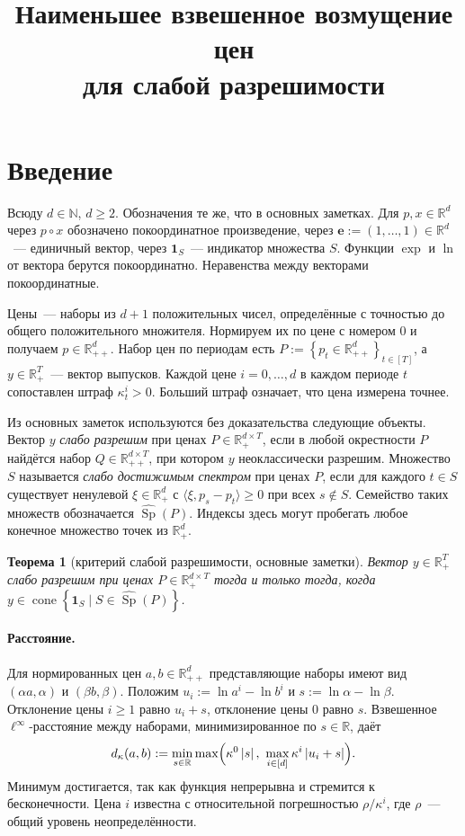 \documentclass[a4paper,11pt]{article}
\title{Наименьшее взвешенное возмущение цен\\ для слабой разрешимости}
\date{}
\theoremstyle{plain}
\newtheorem{theorem}{Теорема}[section]
\theoremstyle{definition}
\theoremstyle{remark}
\newcommand{\R}{\mathbb{R}}
\newcommand{\N}{\mathbb{N}}
\newcommand{\abs}[1]{\left\lvert #1 \right\rvert}
\newcommand{\set}[1]{\left\{ #1 \right\}}
\newcommand{\ip}[2]{\langle #1, #2\rangle} %
\newcommand{\Rpp}[1][2]{\R^{#1}_{++}} %
\newcommand{\Rp}[1][2]{\R^{#1}_{+}}   %
\DeclareMathOperator{\cone}{cone}
\DeclareMathOperator{\Sp}{Sp}
\begin{document}
\maketitle

\section{Введение}

Всюду $d\in\N$, $d\ge2$. Обозначения те же, что в основных заметках. Для $p,x\in\R^d$ через $p\circ x$ обозначено покоординатное произведение, через $\mathbf e:=(1,\dots,1)\in\R^d$~--- единичный вектор, через $\mathbf 1_S$~--- индикатор множества $S$. Функции $\exp$ и $\ln$ от вектора берутся покоординатно. Неравенства между векторами покоординатные.

Цены~--- наборы из $d+1$ положительных чисел, определённые с точностью до общего положительного множителя. Нормируем их по цене с номером $0$ и получаем $p\in\Rpp[d]$. Набор цен по периодам есть $P:=\set{p_t\in\Rpp[d]}_{t\in[T]}$, а $y\in\Rp[T]$~--- вектор выпусков. Каждой цене $i=0,\dots,d$ в каждом периоде $t$ сопоставлен штраф $\kappa^i_t>0$. Больший штраф означает, что цена измерена точнее.

Из основных заметок используются без доказательства следующие объекты. Вектор $y$ \textit{слабо разрешим} при ценах $P\in\Rp[d\times T]$, если в любой окрестности $P$ найдётся набор $Q\in\Rpp[d\times T]$, при котором $y$ неоклассически разрешим. Множество $S$ называется \textit{слабо достижимым спектром} при ценах $P$, если для каждого $t\in S$ существует ненулевой $\xi\in\Rp[d]$ с $\ip{\xi}{p_s-p_t}\ge0$ при всех $s\notin S$. Семейство таких множеств обозначается $\widehat{\Sp}(P)$. Индексы здесь могут пробегать любое конечное множество точек из $\Rp[d]$.

\begin{theorem}[критерий слабой разрешимости, основные заметки]\label{thm:closure}
    Вектор $y\in\Rp[T]$ слабо разрешим при ценах $P\in\Rp[d\times T]$ тогда и только тогда, когда $y\in\cone\set{\mathbf 1_S\mid S\in\widehat{\Sp}(P)}$.
\end{theorem}

\paragraph{Расстояние.}
Для нормированных цен $a,b\in\Rpp[d]$ представляющие наборы имеют вид $(\alpha a,\alpha)$ и $(\beta b,\beta)$. Положим $u_i:=\ln a^i-\ln b^i$ и $s:=\ln\alpha-\ln\beta$. Отклонение цены $i\ge1$ равно $u_i+s$, отклонение цены $0$ равно $s$. Взвешенное $\ell^\infty$-расстояние между наборами, минимизированное по $s\in\R$, даёт
\[
    d_\kappa(a,b):=\min_{s\in\R}\max\Bigl(\kappa^0\abs{s},\ \max_{i\in[d]}\kappa^i\abs{u_i+s}\Bigr).
\]
Минимум достигается, так как функция непрерывна и стремится к бесконечности. Цена $i$ известна с относительной погрешностью $\rho/\kappa^i$, где $\rho$~--- общий уровень неопределённости.
\end{document}
